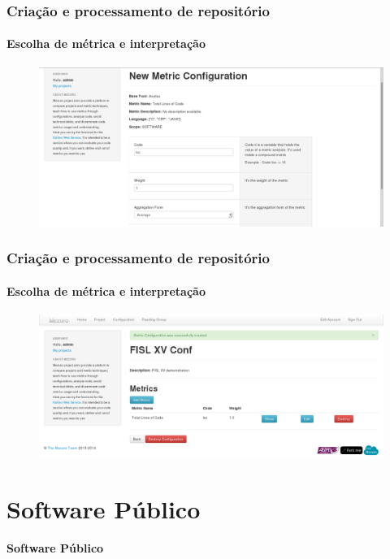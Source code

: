 \documentclass{beamer}
\begin{document}
  \begin{frame}
    \frametitle{Criação e processamento de repositório}
    \framesubtitle{Escolha de métrica e interpretação}

    \begin{figure}[htb]
      \begin{center}
        \includegraphics[scale=0.24]{images/08-new-metric-form.png}
      \end{center}
    \end{figure}
  \end{frame}

  \begin{frame}
    \frametitle{Criação e processamento de repositório}
    \framesubtitle{Escolha de métrica e interpretação}

    \begin{figure}[htb]
      \begin{center}
        \includegraphics[scale=0.24]{images/09-new-metric-created.png}
      \end{center}
    \end{figure}
  \end{frame}

\section{Software Público}
\begin{frame}
  \LARGE{\textbf{Software Público}}
\end{frame}
\end{document}

